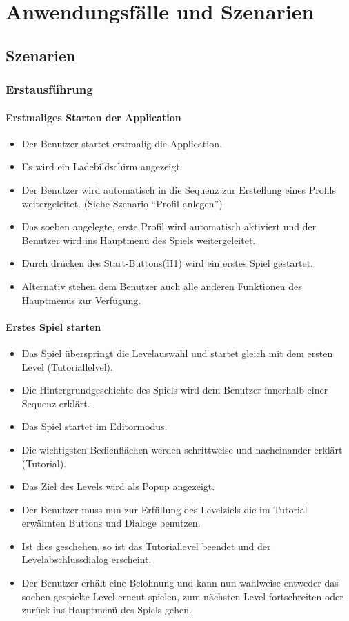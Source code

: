 \section{Anwendungsfälle und Szenarien}

\subsection{Szenarien}

\subsubsection{Erstausführung}
\paragraph{Erstmaliges Starten der Application}
\begin{itemize}
	\item Der Benutzer startet erstmalig die Application.
	\item Es wird ein Ladebildschirm angezeigt.
	\item Der Benutzer wird automatisch in die Sequenz zur Erstellung eines Profils weitergeleitet. (Siehe Szenario "`Profil anlegen"')
	\item Das soeben angelegte, erste Profil wird automatisch aktiviert und der Benutzer wird ins Hauptmenü des Spiels weitergeleitet.
	\item Durch drücken des Start-Buttons(H1) wird ein erstes Spiel gestartet.
	\item Alternativ stehen dem Benutzer auch alle anderen Funktionen des Hauptmenüs zur Verfügung.
\end{itemize}
\paragraph{Erstes Spiel starten}
\begin{itemize}
	\item Das Spiel überspringt die Levelauswahl und startet gleich mit dem ersten Level (Tutoriallelvel).
	\item Die Hintergrundgeschichte des Spiels wird dem Benutzer innerhalb einer Sequenz erklärt.
	\item Das Spiel startet im Editormodus.
	\item Die wichtigsten Bedienflächen werden schrittweise und nacheinander erklärt (Tutorial).
	\item Das Ziel des Levels wird als Popup angezeigt.
	\item Der Benutzer muss nun zur Erfüllung des Levelziels die im Tutorial erwähnten Buttons und Dialoge benutzen.
	\item Ist dies geschehen, so ist das Tutoriallevel beendet und der Levelabschlussdialog erscheint.
	\item Der Benutzer erhält eine Belohnung und kann nun wahlweise entweder das soeben gespielte Level erneut spielen, zum nächsten Level fortschreiten oder zurück ins Hauptmenü des Spiels gehen.
\end{itemize}

